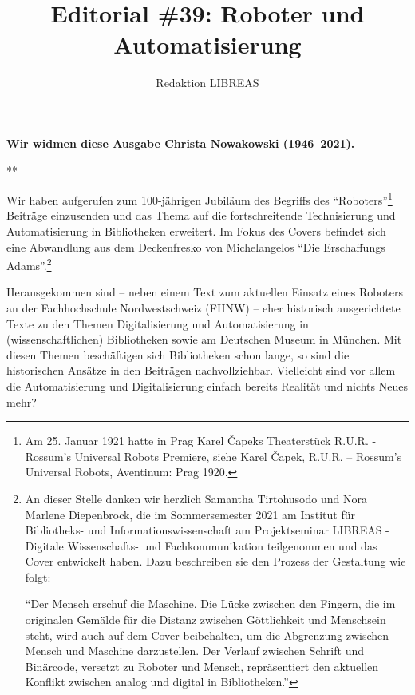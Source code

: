 \documentclass[a4paper,
fontsize=11pt,
oneside,
numbers=noperiodatend,
parskip=half-,
bibliography=totoc,
final
]{scrartcl}
\title{\LARGE{Editorial \#39: Roboter und Automatisierung}}%
\author{Redaktion LIBREAS} %
\date{}
\begin{document}
\maketitle
\thispagestyle{fancyplain} 


{\par \centering \textbf{Wir widmen diese Ausgabe Christa Nowakowski (1946--2021).}\par}

{\par \centering ***\par}

Wir haben aufgerufen zum 100-jährigen Jubiläum des Begriffs des
\enquote{Roboters}\footnote{Am 25. Januar 1921 hatte in Prag Karel
  Čapeks Theaterstück R.U.R. - Rossum's Universal Robots Premiere, siehe
  Karel Čapek, R.U.R. -- Rossum's Universal Robots, Aventinum: Prag
  1920.} Beiträge einzusenden und das Thema auf die fortschreitende
Technisierung und Automatisierung in Bibliotheken erweitert. Im Fokus
des Covers befindet sich eine Abwandlung aus dem Deckenfresko von
Michelangelos \enquote{Die Erschaffungs Adams}.\footnote{An dieser
  Stelle danken wir herzlich Samantha Tirtohusodo und Nora Marlene
  Diepenbrock, die im Sommersemester 2021 am Institut für Bibliotheks-
  und Informationswissenschaft am Projektseminar LIBREAS - Digitale
  Wissenschafts- und Fachkommunikation teilgenommen und das Cover
  entwickelt haben. Dazu beschreiben sie den Prozess der Gestaltung wie
  folgt:

  \enquote{Der Mensch erschuf die Maschine. Die Lücke zwischen den Fingern, die
  im originalen Gemälde für die Distanz zwischen Göttlichkeit und
  Menschsein steht, wird auch auf dem Cover beibehalten, um die
  Abgrenzung zwischen Mensch und Maschine darzustellen. Der Verlauf
  zwischen Schrift und Binärcode, versetzt zu Roboter und Mensch,
  repräsentiert den aktuellen Konflikt zwischen analog und digital in
  Bibliotheken.}}

Herausgekommen sind -- neben einem Text zum aktuellen Einsatz eines
Roboters an der Fachhochschule Nordwestschweiz (FHNW) -- eher historisch
ausgerichtete Texte zu den Themen Digitalisierung und Automatisierung in
(wissenschaftlichen) Bibliotheken sowie am Deutschen Museum in München.
Mit diesen Themen beschäftigen sich Bibliotheken schon lange, so sind
die historischen Ansätze in den Beiträgen nachvollziehbar. Vielleicht
sind vor allem die Automatisierung und Digitalisierung einfach bereits
Realität und nichts Neues mehr?
\end{document}
